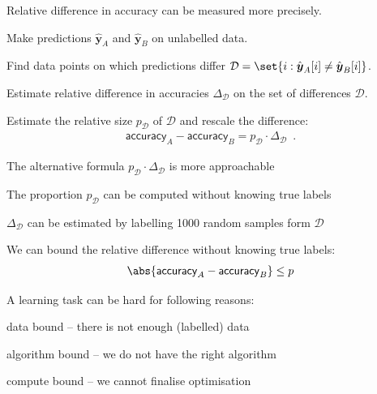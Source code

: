 \documentclass[landscape,footrule]{foils}
\renewcommand{\vec}[1]{\boldsymbol{#1}}
\begin{document}
Relative difference in accuracy can be measured more precisely.
\begin{triangles}
\item Make predictions $\hat{\vec{y}}_A$ and $\hat{\vec{y}}_B$ on unlabelled data.
\item Find data points on which predictions differ $\mathcal{D}=\set{i: \hat{\vec{y}}_A[i]\neq \hat{\vec{y}}_B[i]}$.
\item Estimate relative difference in accuracies $\Delta_\mathcal{D}$ on the set of differences $\mathcal{D}$.
\item Estimate the relative size $p_\mathcal{D}$ of $\mathcal{D}$ and rescale the difference:
\begin{align*}
\mathsf{accuracy}_A-\mathsf{accuracy}_B= p_\mathcal{D}\cdot \Delta_\mathcal{D}\enspace.
\end{align*}  
\end{triangles}



The alternative formula $p_\mathcal{D}\cdot \Delta_\mathcal{D}$ is more approachable
\begin{triangles}
\item The proportion $p_\mathcal{D}$ can be computed without knowing true labels
\item $\Delta_\mathcal{D}$ can be estimated by labelling 1000 random samples form $\mathcal{D}$
\end{triangles}
\vspace*{1cm}

We can bound the relative difference without knowing true labels:
\begin{align*}
\abs{\mathsf{accuracy}_A-\mathsf{accuracy}_B}\leq p
\end{align*}



A learning task can be hard for following reasons:
\begin{triangles}
\item data bound -- there is not enough (labelled) data
\item algorithm bound -- we do not have the right algorithm
\item compute bound -- we cannot finalise optimisation
\end{triangles}
\end{document}
